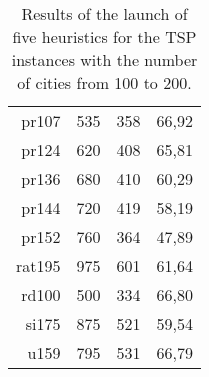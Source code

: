 \begin{table}[!htbp]
\begin{tabular}{||r|r|r|r||}
		pr107         & 535                               & 358                              & 66,92                                                \\
		pr124         & 620                               & 408                              & 65,81                                                \\
		pr136         & 680                               & 410                              & 60,29                                                \\
		pr144         & 720                               & 419                              & 58,19                                                \\
		pr152         & 760                               & 364                              & 47,89                                                \\
		rat195        & 975                               & 601                              & 61,64                                                \\
		rd100         & 500                               & 334                              & 66,80                                                \\
		si175         & 875                               & 521                              & 59,54                                                \\
		u159          & 795                               & 531                              & 66,79 												 \\ \bottomrule
	\end{tabular}
	\caption{Results of the launch of five heuristics for the TSP instances with the number of cities from 100 to 200.}
	\label{Tab:Heuristics_100_200}
\end{table}

